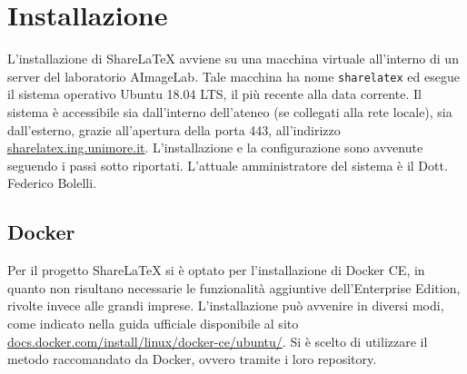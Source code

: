 \chapter{Installazione}
\label{Installazione}
\thispagestyle{empty}

L'installazione di ShareLaTeX avviene su una macchina virtuale all'interno di un server del laboratorio AImageLab. Tale macchina ha nome \verb|sharelatex| ed esegue il sistema operativo Ubuntu 18.04 LTS, il più recente alla data corrente. Il sistema è accessibile sia dall'interno dell'ateneo (se collegati alla rete locale), sia dall'esterno, grazie all'apertura della porta 443, all'indirizzo \url{sharelatex.ing.unimore.it}. L'installazione e la configurazione sono avvenute seguendo i passi sotto riportati. L'attuale amministratore del sistema è il Dott. Federico Bolelli.

\section{Docker}
Per il progetto ShareLaTeX si è optato per l'installazione di Docker CE, in quanto non risultano necessarie le funzionalità aggiuntive dell'Enterprise Edition, rivolte invece alle grandi imprese. L'installazione può avvenire in diversi modi, come indicato nella guida ufficiale disponibile al sito \url{docs.docker.com/install/linux/docker-ce/ubuntu/}. Si è scelto di utilizzare il metodo raccomandato da Docker, ovvero tramite i loro repository.

